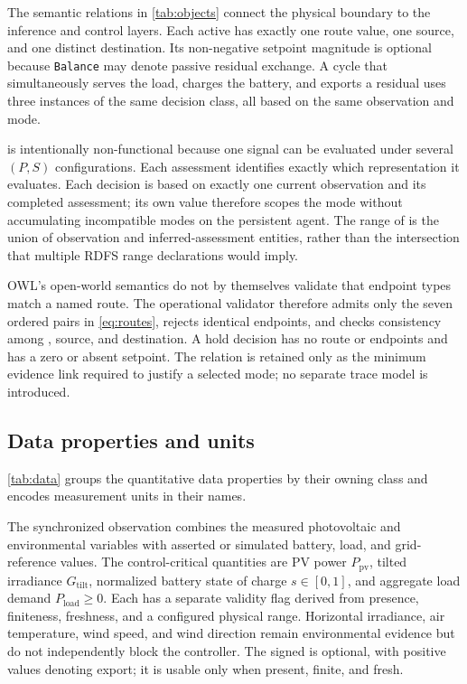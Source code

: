 The semantic relations in \autoref{tab:objects} connect the physical boundary to the inference and control layers. Each active  has exactly one route value, one source, and one distinct destination. Its non-negative setpoint magnitude is optional because \texttt{Balance} may denote passive residual exchange. A cycle that simultaneously serves the load, charges the battery, and exports a residual uses three instances of the same decision class, all based on the same observation and mode.



 is intentionally non-functional because one signal can be evaluated under several $(P,S)$ configurations. Each assessment identifies exactly which representation it evaluates. Each decision is based on exactly one current observation and its completed assessment; its own  value therefore scopes the mode without accumulating incompatible modes on the persistent agent. The range of  is the union of observation and inferred-assessment entities, rather than the intersection that multiple RDFS range declarations would imply.

OWL's open-world semantics do not by themselves validate that endpoint types match a named route. The operational validator therefore admits only the seven ordered pairs in \autoref{eq:routes}, rejects identical endpoints, and checks consistency among , source, and destination. A hold decision has no route or endpoints and has a zero or absent setpoint. The  relation is retained only as the minimum evidence link required to justify a selected mode; no separate trace model is introduced.

\subsection{Data properties and units}

\autoref{tab:data} groups the quantitative data properties by their owning class and encodes measurement units in their names.

The synchronized observation combines the measured photovoltaic and environmental variables with asserted or simulated battery, load, and grid-reference values. The control-critical quantities are PV power $P_{\mathrm{pv}}$, tilted irradiance $G_{\mathrm{tilt}}$, normalized battery state of charge $s\in[0,1]$, and aggregate load demand $P_{\mathrm{load}}\geq0$. Each has a separate validity flag derived from presence, finiteness, freshness, and a configured physical range. Horizontal irradiance, air temperature, wind speed, and wind direction remain environmental evidence but do not independently block the controller. The signed  is optional, with positive values denoting export; it is usable only when present, finite, and fresh.

